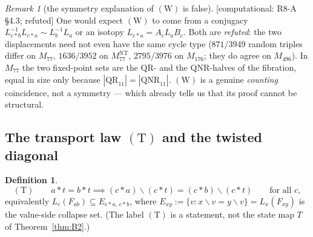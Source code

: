 \documentclass[11pt]{article}
\theoremstyle{plain}
\theoremstyle{definition}
\newtheorem{definition}[theorem]{Definition}
\theoremstyle{remark}
\newtheorem*{remark*}{Remark}
\numberwithin{equation}{section}
\newcommand{\op}{\mathbin{*}}
\newcommand{\statusbox}[1]{{\small\sloppy\textsf{[#1]}}}
\newcommand{\COMP}[1]{\statusbox{computational: #1}}
\begin{document}
\begin{remark*}[the symmetry explanation of $(\mathrm{W})$ is false]
\COMP{R8-A \S4.3; refuted}
One would expect $(\mathrm{W})$ to come from a conjugacy
$L_{c\op b}^{-1}L_{c\op a}\sim L_b^{-1}L_a$ or an isotopy
$L_{c\op a} = A_cL_aB_c$. Both are \emph{refuted}: the two displacements need not
even have the same cycle type ($871/3949$ random triples differ on $M_{77}$,
$1636/3952$ on $M_{77}^{\mathrm{NT}}$, $2795/3976$ on $M_{176}$; they do agree on
$M_{496}$). In $M_{77}$ the two fixed-point sets are the $\mathrm{QR}$- and the
$\mathrm{QNR}$-halves of the fibration, equal in size only because
$|\mathrm{QR}_{11}| = |\mathrm{QNR}_{11}|$. $(\mathrm{W})$ is a genuine
\emph{counting} coincidence, not a symmetry --- which already tells us that its
proof cannot be structural.
\end{remark*}

\subsection{The transport law $(\mathrm{T})$ and the twisted diagonal}\label{sec:transport}

\begin{definition}\label{def:T}
\[
  (\mathrm{T})\qquad a\op t = b\op t \implies
  (c\op a)\backslash(c\op t) = (c\op b)\backslash(c\op t)
  \qquad\text{for all } c,
\]
equivalently $L_c(F_{ab})\subseteq E_{c\op a,\,c\op b}$, where
$E_{xy} := \{v : x\backslash v = y\backslash v\} = L_x(F_{xy})$ is the value-side
collapse set. (The label $(\mathrm{T})$ is a statement, not the state map $T$ of
Theorem~\ref{thm:B2}.)
\end{definition}
\end{document}
